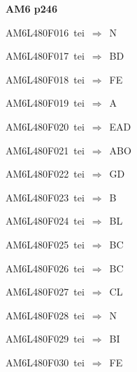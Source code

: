 \par\vfill\eject
{\bf\hfill AM6 p246\hfill\hbox{}}\par\bigskip
{\sixrm AM6L480F016\ {\sixit tei}\ }$\Rightarrow$\ {\tenit N}\par\smallskip
{\sixrm AM6L480F017\ {\sixit tei}\ }$\Rightarrow$\ BD\par\smallskip
{\sixrm AM6L480F018\ {\sixit tei}\ }$\Rightarrow$\ FE\par\smallskip
{\sixrm AM6L480F019\ {\sixit tei}\ }$\Rightarrow$\ {\tenit A}\par\smallskip
{\sixrm AM6L480F020\ {\sixit tei}\ }$\Rightarrow$\ EAD\par\smallskip
{\sixrm AM6L480F021\ {\sixit tei}\ }$\Rightarrow$\ ABO\par\smallskip
{\sixrm AM6L480F022\ {\sixit tei}\ }$\Rightarrow$\ GD\par\smallskip
{\sixrm AM6L480F023\ {\sixit tei}\ }$\Rightarrow$\ {\tenit B}\par\smallskip
{\sixrm AM6L480F024\ {\sixit tei}\ }$\Rightarrow$\ BL\par\smallskip
{\sixrm AM6L480F025\ {\sixit tei}\ }$\Rightarrow$\ BC\par\smallskip
{\sixrm AM6L480F026\ {\sixit tei}\ }$\Rightarrow$\ BC\par\smallskip
{\sixrm AM6L480F027\ {\sixit tei}\ }$\Rightarrow$\ CL\par\smallskip
{\sixrm AM6L480F028\ {\sixit tei}\ }$\Rightarrow$\ {\tenit N}\par\smallskip
{\sixrm AM6L480F029\ {\sixit tei}\ }$\Rightarrow$\ BI\par\smallskip
{\sixrm AM6L480F030\ {\sixit tei}\ }$\Rightarrow$\ FE\par\smallskip

